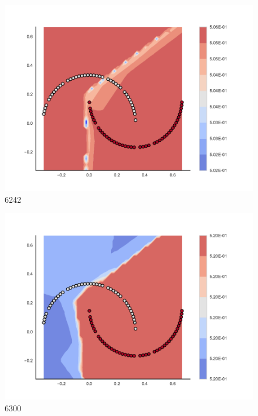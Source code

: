 \begin{subfigure}[b]{0.09\textwidth}
    \includegraphics[clip, trim=2.35cm 1.75cm 4.5cm 0cm,width=\textwidth]{img/convergence/6242.pdf}
    \caption{6242}
    \label{fig:convergence_6242}
\end{subfigure}
%
\begin{subfigure}[b]{0.09\textwidth}
    \includegraphics[clip, trim=2.35cm 1.75cm 4.5cm 0cm,width=\textwidth]{img/convergence/6300.pdf}
    \caption{6300}
    \label{fig:convergence_6300}
\end{subfigure}
%
